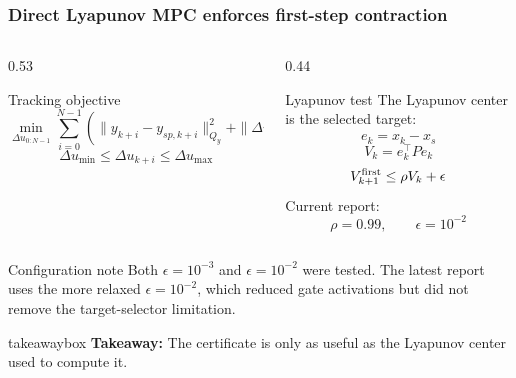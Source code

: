 \documentclass[aspectratio=169]{beamer}
\newcommand{\takeawaybox}[1]{%
\vspace{0.03cm}
\begin{center}
\begin{beamercolorbox}[wd=0.94\textwidth,sep=3pt,center,rounded=true,shadow=false]{takeawaybox}
\scriptsize
\textbf{\textcolor{maroon1}{Takeaway:}} #1
\end{beamercolorbox}
\end{center}
}
\begin{document}
\begin{frame}
\frametitle{\large \textbf{Direct Lyapunov MPC enforces first-step contraction}}
\scriptsize

\begin{columns}[T,onlytextwidth]
\begin{column}{0.53\textwidth}
\begin{block}{Tracking objective}
\[
\min_{\Delta u_{0:N-1}}
\sum_{i=0}^{N-1}
\left(
\|y_{k+i}-y_{sp,k+i}\|_{Q_y}^2
+\|\Delta u_{k+i}-\Delta u_{k+i-1}\|_{R_{\Delta u}}^2
\right)
\]
\[
\Delta u_{\min}\le \Delta u_{k+i}\le \Delta u_{\max}
\]
\end{block}
\end{column}

\begin{column}{0.44\textwidth}
\begin{block}{Lyapunov test}
The Lyapunov center is the selected target:
\[
e_k=\hat x_k-x_s
\]
\[
V_k=e_k^\top P e_k
\]
\[
V_{k+1}^{\rm first}\le \rho V_k+\epsilon
\]
Current report:
\[
\rho=0.99,\qquad \epsilon=10^{-2}
\]
\end{block}
\end{column}
\end{columns}

\begin{block}{Configuration note}
\justifying
Both $\epsilon=10^{-3}$ and $\epsilon=10^{-2}$ were tested. The latest report uses the more relaxed $\epsilon=10^{-2}$, which reduced gate activations but did not remove the target-selector limitation.
\end{block}

\takeawaybox{The certificate is only as useful as the Lyapunov center used to compute it.}
\end{frame}
\end{document}
